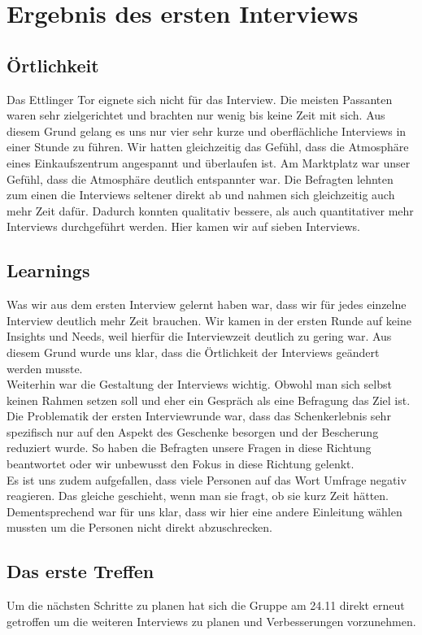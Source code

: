 \documentclass[12pt,ngerman, fleqn]{book} %
\begin{document}
\section{Ergebnis des ersten Interviews}
\subsection{Örtlichkeit}
Das Ettlinger Tor eignete sich nicht für das Interview. Die meisten Passanten waren sehr zielgerichtet und brachten nur wenig bis keine Zeit mit sich. Aus diesem Grund gelang es uns nur vier sehr kurze und oberflächliche Interviews in einer Stunde zu führen. Wir hatten gleichzeitig das Gefühl, dass die Atmosphäre eines Einkaufszentrum angespannt und überlaufen ist.
Am Marktplatz war unser Gefühl, dass die Atmosphäre deutlich entspannter war. Die Befragten  lehnten zum einen die Interviews seltener direkt ab und nahmen sich gleichzeitig auch mehr Zeit dafür. Dadurch konnten qualitativ bessere, als auch quantitativer mehr Interviews durchgeführt werden. Hier kamen wir auf sieben Interviews.

\subsection{Learnings}
Was wir aus dem ersten Interview gelernt haben war, dass wir für jedes einzelne Interview deutlich mehr Zeit brauchen. Wir kamen in der ersten Runde auf keine Insights und Needs, weil hierfür die Interviewzeit deutlich zu gering war. Aus diesem Grund wurde uns klar, dass die Örtlichkeit der Interviews geändert werden musste.\\

Weiterhin war die Gestaltung der Interviews wichtig. Obwohl man sich selbst keinen Rahmen setzen soll und eher ein Gespräch als eine Befragung das Ziel ist. Die Problematik der ersten Interviewrunde war, dass das Schenkerlebnis sehr spezifisch nur auf den Aspekt des Geschenke besorgen und der Bescherung reduziert wurde. So haben die Befragten unsere Fragen in diese Richtung beantwortet oder wir unbewusst den Fokus in diese Richtung gelenkt.\\

Es ist uns zudem aufgefallen, dass viele Personen auf das Wort Umfrage negativ reagieren. Das gleiche geschieht, wenn man sie fragt, ob sie kurz Zeit hätten. Dementsprechend war für uns klar, dass wir hier eine andere Einleitung wählen mussten um die Personen nicht direkt abzuschrecken.

\subsection{Das erste Treffen}
Um die nächsten Schritte zu planen hat sich die Gruppe am 24.11 direkt erneut getroffen um die weiteren Interviews zu planen und Verbesserungen vorzunehmen.
\end{document}
